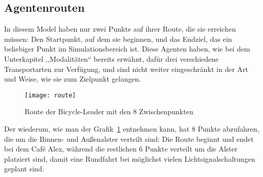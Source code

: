 %

\subsection{Agentenrouten}\label{subsec:routs}

In diesem Model haben  nur zwei Punkte auf ihrer Route, die sie erreichen müssen: Den Startpunkt, auf dem sie beginnen, und das Endziel, das ein beliebiger Punkt im Simulationsbereich ist.
Diese Agenten haben, wie bei dem Unterkapitel ,,Modalitäten`` bereits erwähnt, dafür drei verschiedene Transportarten zur Verfügung, und sind nicht weiter eingeschränkt in der Art und Weise, wie sie zum Zielpunkt gelangen.

\begin{figure}[h]
    \centering
    \texttt{[image: route]}
    \caption{Route der Bicycle-Leader mit den 8 Zwischenpunkten}
    \label{fig:bicycleleader-route}
\end{figure}

Der  wiederum, wie man der Grafik~\ref{fig:bicycleleader-route} entnehmen kann, hat 8 Punkte abzufahren, die um die Binnen- und Außenalster verteilt sind:
Die Route beginnt und endet bei dem Café Alex, während die restlichen 6 Punkte verteilt um die Alster platziert sind, damit eine Rundfahrt bei möglichst vielen Lichtsignalschaltungen geplant sind.

